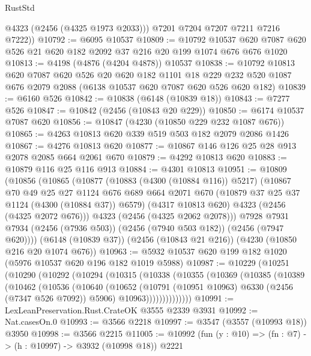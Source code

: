 \begin{lexlean}{RustStd}
\begin{coremodule}
          @4323
          (@2456 (@4325 @1973 @2033)))
        @7201
        @7204
        @7207
        @7211
        @7216
        @7222))
@10792 := @6095 @10537
@10809 := @10792
    @10537
    @620
    @7087
    @620
    @526
    @21
    @620
    @182
    @2092
    @37
    @216
    @20
    @199
    @1074
    @676
    @676
    @1020
@10813 := @4198 (@4876 (@4204 @4878)) @10537
@10838 := @10792
    @10813
    @620
    @7087
    @620
    @526
    @20
    @620
    @182
    @1101
    @18
    @229
    @232
    @520
    @1087
    @676
    @2079
    @2088
    (@6138 @10537 @620 @7087 @620 @526 @620 @182)
@10839 := @6160 @526
@10842 := @10838 (@6148 (@10839 @18))
@10843 := @7277 @526
@10847 := @10842 (@2456 (@10843 @20 @229))
@10850 := @6174 @10537 @7087 @620
@10856 := @10847 (@4230 (@10850 @229 @232 @1087 @676))
@10865 := @4263 @10813 @620 @339 @519 @503 @182 @2079 @2086 @1426
@10867 := @4276 @10813 @620
@10877 := @10867 @146 @126 @25 @28 @913 @2078 @2085 @664 @2061 @670
@10879 := @4292 @10813 @620
@10883 := @10879 @116 @25 @116 @913
@10884 := @4301 @10813
@10951 := @10809
    (@10856
      (@10865
        (@10877
          (@10883 (@4300 (@10884 @116)) @5217)
          (@10867
            @70
            @49
            @25
            @27
            @1124
            @676
            @689
            @664
            @2071
            @670
            (@10879 @37 @25 @37 @1124 (@4300 (@10884 @37)) @6579)
            (@4317 @10813 @620)
            @4323
            (@2456 (@4325 @2072 @676)))
          @4323
          (@2456 (@4325 @2062 @2078)))
        @7928
        @7931
        @7934
        (@2456 (@7936 @503))
        (@2456 (@7940 @503 @182))
        (@2456 (@7947 @620))))
    (@6148 (@10839 @37))
    (@2456 (@10843 @21 @216))
    (@4230 (@10850 @216 @20 @1074 @676))
@10963 := @5932 @10537 @620 @199 @182 @1020 (@5976 @10537 @620 @196 @182 @1019 @5988)
@10987 := @10229
    (@10251
      (@10290
        (@10292
          (@10294
            (@10315
              (@10338
                (@10355
                  (@10369
                    (@10385
                      (@10389
                        (@10462
                          (@10536
                            (@10640
                              (@10652
                                (@10791 (@10951 @10963) @6330 (@2456 (@7347 @526 @7092)) @5906)
                                @10963))))))))))))))
@10991 := LexLeanPreservation.Rust.CrateOK @3555 @2339 @3931
@10992 := Nat.casesOn.{0}
@10993 := @3566 @2218
@10997 := @3547 (@3557 (@10993 @18)) @3950
@10998 := @3566 @2215
@11005 := @10992 (fun (y : @10) => (fn : @7) -> (h : @10997) -> @3932 (@10998 @18)) @2221

\end{coremodule}
\end{lexlean}
